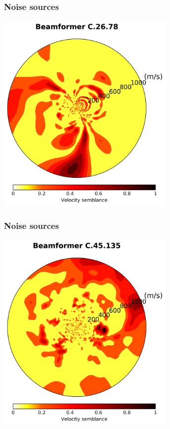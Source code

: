 \documentclass{beamer}
\begin{document}
\frame
{
\frametitle{{\bf Noise sources}}
\centering
\includegraphics[width=0.65\textwidth]{../pics/C-26-78/beamformer.png}
}
\frame
{
\frametitle{{\bf Noise sources}}
\centering
\includegraphics[width=0.65\textwidth]{../pics/C-45-135/beamformer.png}
}
\end{document}
